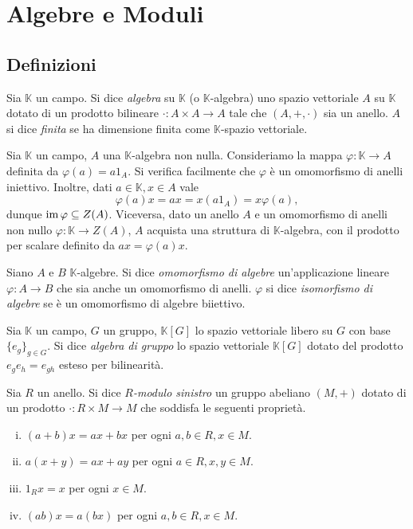 \chapter{Algebre e Moduli}

\section{Definizioni}

\begin{definition}
Sia $\mathbb{K}$ un campo. Si dice \emph{algebra} su $\mathbb{K}$ (o $\mathbb{K}$-algebra) uno spazio vettoriale $A$ su $\mathbb{K}$ dotato di un prodotto bilineare $\cdot:A\times A\to A$ tale che $(A,+,\cdot)$ sia un anello. $A$ si dice \emph{finita} se ha dimensione finita come $\mathbb{K}$-spazio vettoriale.
\end{definition}

\begin{remark}
Sia $\mathbb{K}$ un campo, $A$ una $\mathbb{K}$-algebra non nulla. Consideriamo la mappa $\varphi:\mathbb{K}\to A$ definita da $\varphi(a)=a1_A$. Si verifica facilmente che $\varphi$ è un omomorfismo di anelli iniettivo. Inoltre, dati $a\in\mathbb{K}\comma x\in A$ vale
$$
\varphi(a)x=ax=x(a1_A)=x\varphi(a),
$$
dunque $\operatorname{im}\varphi\subseteq Z(A)$. Viceversa, dato un anello $A$ e un omomorfismo di anelli non nullo $\varphi:\mathbb{K}\to Z(A)$, $A$ acquista una struttura di $\mathbb{K}$-algebra, con il prodotto per scalare definito da $ax=\varphi(a)x$.
\end{remark}

\begin{definition}
Siano $A$ e $B$ $\mathbb{K}$-algebre. Si dice \emph{omomorfismo di algebre} un'applicazione lineare $\varphi:A\to B$ che sia anche un omomorfismo di anelli. $\varphi$ si dice \emph{isomorfismo di algebre} se è un omomorfismo di algebre biiettivo.
\end{definition}

\begin{definition}
Sia $\mathbb{K}$ un campo, $G$ un gruppo, $\mathbb{K}[G]$ lo spazio vettoriale libero su $G$ con base $\{e_g\}_{g\in G}$. Si dice \emph{algebra di gruppo} lo spazio vettoriale $\mathbb{K}[G]$ dotato del prodotto $e_ge_h=e_{gh}$ esteso per bilinearità.
\end{definition}

\begin{definition}
Sia $R$ un anello. Si dice \emph{$R$-modulo sinistro} un gruppo abeliano $(M,+)$ dotato di un prodotto $\cdot:R\times M\to M$ che soddisfa le seguenti proprietà.
\begin{enumerate}[(i)]
\item $(a+b)x=ax+bx$ per ogni $a,b\in R\comma x\in M$.
\item $a(x+y)=ax+ay$ per ogni $a\in R\comma x,y\in M$.
\item $1_Rx=x$ per ogni $x\in M$.
\item $(ab)x=a(bx)$ per ogni $a,b\in R\comma x\in M$.
\end{enumerate}
\end{definition}

